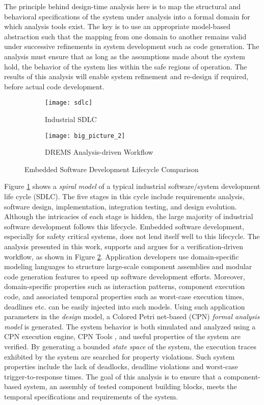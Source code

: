 The principle behind design-time analysis here is to map the structural and behavioral specifications of the system under analysis into a formal domain for which analysis tools exist. The key is to use an appropriate model-based abstraction such that the mapping from one domain to another remains valid under successive refinements in system development such as code generation. The analysis must ensure that as long as the assumptions made about the system hold, the behavior of the system lies within the safe regions of operation. The results of this analysis will enable system refinement and re-design if required, before actual code development. 

\begin{figure}
	\centering
	\begin{subfigure}{.5\textwidth}
		\centering
		\texttt{[image: sdlc]}
		\caption{Industrial SDLC}
		\label{fig:sdlc}
	\end{subfigure}%
	\begin{subfigure}{.5\textwidth}
		\centering
		\texttt{[image: big\_picture\_2]}
		\caption{DREMS Analysis-driven Workflow}
		\label{fig:big_picture}
	\end{subfigure}
	\caption{Embedded Software Development Lifecycle Comparison}
	\label{fig:test}
\end{figure}

Figure \ref{fig:sdlc} shows a \emph{spiral model} \cite{boehm1988spiral} of a typical industrial software/system development life cycle (SDLC). The five stages in this cycle include requirements analysis, software design, implementation, integration testing, and design evolution. Although the intricacies of each stage is hidden, the large majority of industrial software development follows this lifecycle. Embedded software development, especially for safety critical systems, does not lend itself well to this lifecycle. The analysis presented in this work, supports and argues for a verification-driven workflow, as shown in Figure \ref{fig:big_picture}. Application developers use domain-specific modeling languages to structure large-scale component assemblies and modular code generation features to speed up software development efforts. Moreover, domain-specific properties such as interaction patterns, component execution code, and associated temporal properties such as worst-case execution times, deadlines etc. can be easily injected into such models. Using such application parameters in the \textit{design} model, a Colored Petri net-based (CPN) \cite{CPN} \textit{formal analysis model} is generated. The system behavior is both simulated and analyzed using a CPN execution engine, CPN Tools \cite{CPNTools}, and useful properties of the system are verified. By generating a bounded \emph{state space} of the system, the execution traces exhibited by the system are searched for property violations. Such system properties include the lack of deadlocks, deadline violations and worst-case trigger-to-response times. The goal of this analysis is to ensure that a component-based system, an assembly of tested component building blocks, meets the temporal specifications and requirements of the system.  

